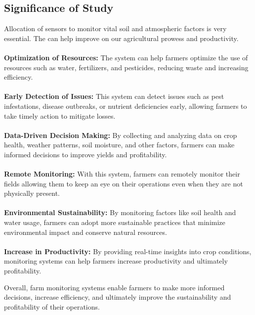 \documentclass[12pt, a4paper]{article}
\begin{document}
\newpage
\subsection{Significance of Study}
Allocation of sensors to monitor vital soil and atmospheric factors is very essential. The can help improve on our agricultural prowess and productivity. 
\\ \\
\textbf{Optimization of Resources:} The system can help farmers optimize the use of resources such as water, fertilizers, and pesticides, reducing waste and increasing efficiency.
\\ \\
\textbf{Early Detection of Issues:} This system can detect issues such as pest infestations, disease outbreaks, or nutrient deficiencies early, allowing farmers to take timely action to mitigate losses.
\\ \\
\textbf{Data-Driven Decision Making:} By collecting and analyzing data on crop health, weather patterns, soil moisture, and other factors, farmers can make informed decisions to improve yields and profitability.
\\ \\
\textbf{Remote Monitoring:} With this system, farmers can remotely monitor their fields allowing them to keep an eye on their operations even when they are not physically present.
\\ \\
\textbf{Environmental Sustainability:} By monitoring factors like soil health and water usage, farmers can adopt more sustainable practices that minimize environmental impact and conserve natural resources.
\\ \\
\textbf{Increase in Productivity:} By providing real-time insights into crop conditions, monitoring systems can help farmers increase productivity and ultimately profitability.


Overall, farm monitoring systems enable farmers to make more informed decisions, increase efficiency, and ultimately improve the sustainability and profitability of their operations.

\newpage
\end{document}
